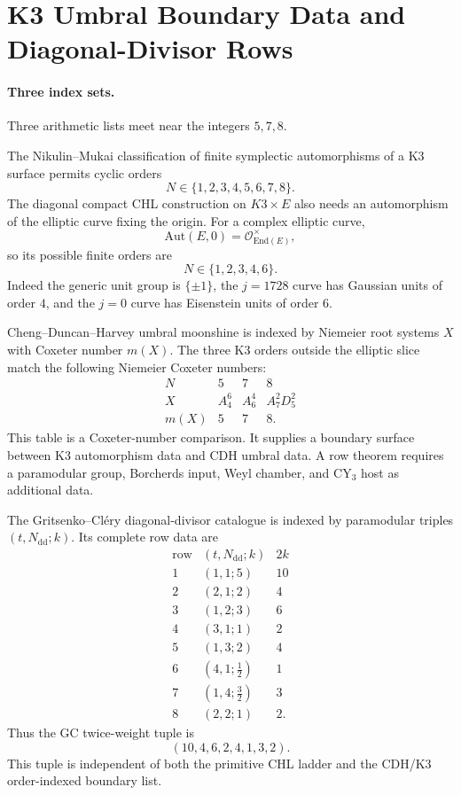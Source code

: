 \providecommand{\paramod}[1]{\Gamma_{#1}}
\providecommand{\paramodlvl}[2]{\Gamma_{#1}(#2)}
\providecommand{\kBKM}{\kappa_{\mathrm{BKM}}}
\providecommand{\kcat}{\kappa_{\mathrm{cat}}}
\providecommand{\kch}{\kappa_{\mathrm{ch}}}
\providecommand{\kHeis}{\kappa_{\mathrm{ch}}^{\mathrm{Heis}}}
\providecommand{\kfib}{\kappa_{\mathrm{fiber}}}
\providecommand{\wt}{\mathrm{wt}}
\providecommand{\Dfive}{D_5}

\section{K3 Umbral Boundary Data and Diagonal-Divisor Rows}
\label{sec:cdh-umbral-boundary-dictionary}

\paragraph{Three index sets.}
Three arithmetic lists meet near the integers $5,7,8$.

The Nikulin--Mukai classification of finite symplectic automorphisms of
a K3 surface permits cyclic orders
\[
  N\in\{1,2,3,4,5,6,7,8\}.
\]
The diagonal compact CHL construction on $K3\times E$ also needs an
automorphism of the elliptic curve fixing the origin.  For a complex
elliptic curve,
\[
 \mathrm{Aut}(E,0)=\mathcal O_{\mathrm{End}(E)}^\times,
\]
so its possible finite orders are
\[
  N\in\{1,2,3,4,6\}.
\]
Indeed the generic unit group is $\{\pm1\}$, the $j=1728$ curve has
Gaussian units of order $4$, and the $j=0$ curve has Eisenstein units
of order $6$.

Cheng--Duncan--Harvey umbral moonshine is indexed by Niemeier root
systems $X$ with Coxeter number $m(X)$.  The three K3 orders outside
the elliptic slice match the following Niemeier Coxeter numbers:
\[
\begin{array}{c|ccc}
N & 5 & 7 & 8 \\ \hline
X & A_4^6 & A_6^4 & A_7^2D_5^2 \\
m(X) & 5 & 7 & 8 .
\end{array}
\]
This table is a Coxeter-number comparison.  It supplies a boundary
surface between K3 automorphism data and CDH umbral data.  A row theorem
requires a paramodular group, Borcherds input, Weyl chamber, and CY$_3$
host as additional data.

The Gritsenko--Cl\'ery diagonal-divisor catalogue is indexed by
paramodular triples $(t,N_{\mathrm{dd}};k)$.  Its complete row data are
\[
\begin{array}{c|c|c}
\text{row} & (t,N_{\mathrm{dd}};k) & 2k \\ \hline
1 & (1,1;5) & 10 \\
2 & (2,1;2) & 4 \\
3 & (1,2;3) & 6 \\
4 & (3,1;1) & 2 \\
5 & (1,3;2) & 4 \\
6 & (4,1;\tfrac12) & 1 \\
7 & (1,4;\tfrac32) & 3 \\
8 & (2,2;1) & 2 .
\end{array}
\]
Thus the GC twice-weight tuple is
\[
 (10,4,6,2,4,1,3,2).
\]
This tuple is independent of both the primitive CHL ladder and the
CDH/K3 order-indexed boundary list.

